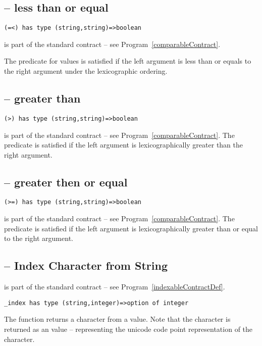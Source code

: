 \subsection{\q{=<} -- less than or equal}
\begin{lstlisting}
(=<) has type (string,string)=>boolean
\end{lstlisting}
\q{(=<)} is part of the standard  contract -- see Program~\vref{comparableContract}.

The \q{=<} predicate for  values is satisfied if the left argument is less than or equals to the right argument under the lexicographic ordering.

\subsection{\q{>} -- greater than}
\begin{lstlisting}
(>) has type (string,string)=>boolean
\end{lstlisting}
\q{(>)} is part of the standard  contract -- see Program~\vref{comparableContract}.
The \q{>} predicate is satisfied if the left argument is lexicographically greater than the right argument.

\subsection{\q{>=} -- greater then or equal}
\begin{lstlisting}
(>=) has type (string,string)=>boolean
\end{lstlisting}
\q{(>=)} is part of the standard  contract -- see Program~\vref{comparableContract}.
The \q{>=} predicate is satisfied if the left argument is lexicographically greater than or equal to the right argument.

\subsection{ -- Index Character from String}
\label{indexString}
 is part of the standard  contract -- see Program~\vref{indexableContractDef}.
\begin{lstlisting}
_index has type (string,integer)=>option of integer
\end{lstlisting}
The  function returns a character from a  value. Note that the character is returned as an  value -- representing the unicode code point representation of the character.


